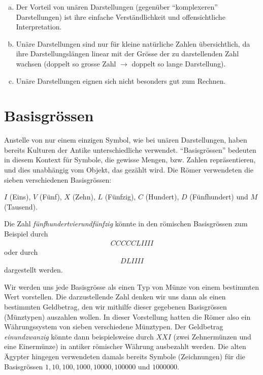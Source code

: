 \begin{myremark}\leavevmode
	\begin{enumerate}[(a)]
		\item Der Vorteil von unären Darstellungen (gegenüber \enquote{komplexeren} Darstellungen) ist ihre einfache Verständlichkeit und
		      offensichtliche Interpretation.
		\item Unäre Darstellungen sind nur für kleine natürliche Zahlen übersichtlich, da ihre Darstellungslängen linear mit der Grösse der zu
		      darstellenden Zahl wachsen (doppelt so grosse Zahl $\rightarrow$ doppelt so lange Darstellung).
		\item Unäre Darstellungen eignen sich nicht besonders gut zum Rechnen.
	\end{enumerate}
\end{myremark}

\section{Basisgrössen}\label{section:Basisgroessen}
Anstelle von nur einem einzigen Symbol, wie bei unären Darstellungen, haben bereits Kulturen der Antike unterschiedliche
 verwendet. \enquote{Basisgrössen} bedeuten in diesem Kontext für Symbole, die gewisse Mengen, bzw. Zahlen repräsentieren, und dies unabhängig vom Objekt, das gezählt wird. Die Römer verwendeten die sieben verschiedenen Basisgrössen:
\begin{center}
	$I$ (Eins), $V$ (Fünf), $X$ (Zehn), $L$ (Fünfzig), $C$ (Hundert), $D$ (Fünfhundert) und $M$ (Tausend).
\end{center}
\begin{myexample}\label{myexample:roman}
Die Zahl \textit{fünfhundertvierundfünfzig} könnte in den römischen Basisgrössen zum Beispiel durch
\begin{align*}
	CCCCCLIIII
\end{align*}
oder durch
\begin{align*}
	DLIIII
\end{align*}
dargestellt werden.
\end{myexample}
Wir werden uns jede Basisgrösse als einen Typ von Münze von einem bestimmten Wert vorstellen. Die darzustellende Zahl
denken wir uns dann als einen bestimmten Geldbetrag, den wir mithilfe dieser gegebenen Basisgrössen (Münztypen) auszahlen wollen. In
dieser Vorstellung hatten die Römer also ein Währungssystem von sieben verschiedene Münztypen. Der Geldbetrag \textit{einundzwanzig} könnte
dann beispielsweise durch $XXI$ (zwei Zehnermünzen und eine Einermünze) in antiker römischer Währung ausbezahlt werden. Die alten Ägypter hingegen verwendeten damals bereits Symbole (Zeichnungen) für die Basisgrössen $1, 10, 100, 1000, 10000,
	100000$ und $1000000$.

